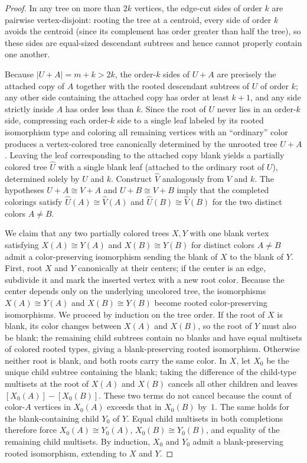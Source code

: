 \documentclass[10pt]{article}
\begin{document}
\begin{proof}
In any tree on more than $2k$ vertices, the edge-cut sides of order $k$ are pairwise vertex-disjoint: rooting the tree at a centroid, every side of order $k$ avoids the centroid (since its complement has order greater than half the tree), so these sides are equal-sized descendant subtrees and hence cannot properly contain one another.

Because $|U+A| = m+k > 2k$, the order-$k$ sides of $U+A$ are precisely the attached copy of $A$ together with the rooted descendant subtrees of $U$ of order $k$; any other side containing the attached copy has order at least $k+1$, and any side strictly inside $A$ has order less than $k$. Since the root of $U$ never lies in an order-$k$ side, compressing each order-$k$ side to a single leaf labeled by its rooted isomorphism type and coloring all remaining vertices with an ``ordinary'' color produces a vertex-colored tree canonically determined by the unrooted tree $U+A$. Leaving the leaf corresponding to the attached copy blank yields a partially colored tree $\widehat{U}$ with a single blank leaf (attached to the ordinary root of $U$), determined solely by $U$ and $k$. Construct $\widehat{V}$ analogously from $V$ and $k$. The hypotheses $U+A\cong V+A$ and $U+B\cong V+B$ imply that the completed colorings satisfy $\widehat{U}(A)\cong \widehat{V}(A)$ and $\widehat{U}(B)\cong \widehat{V}(B)$ for the two distinct colors $A\neq B$.

We claim that any two partially colored trees $X,Y$ with one blank vertex satisfying $X(A)\cong Y(A)$ and $X(B)\cong Y(B)$ for distinct colors $A\neq B$ admit a color-preserving isomorphism sending the blank of $X$ to the blank of $Y$. First, root $X$ and $Y$ canonically at their centers; if the center is an edge, subdivide it and mark the inserted vertex with a new root color. Because the center depends only on the underlying uncolored tree, the isomorphisms $X(A)\cong Y(A)$ and $X(B)\cong Y(B)$ become rooted color-preserving isomorphisms. We proceed by induction on the tree order. If the root of $X$ is blank, its color changes between $X(A)$ and $X(B)$, so the root of $Y$ must also be blank; the remaining child subtrees contain no blanks and have equal multisets of colored rooted types, giving a blank-preserving rooted isomorphism. Otherwise neither root is blank, and both roots carry the same color. In $X$, let $X_0$ be the unique child subtree containing the blank; taking the difference of the child-type multisets at the root of $X(A)$ and $X(B)$ cancels all other children and leaves $[X_0(A)]-[X_0(B)]$. These two terms do not cancel because the count of color-$A$ vertices in $X_0(A)$ exceeds that in $X_0(B)$ by~$1$. The same holds for the blank-containing child $Y_0$ of $Y$. Equal child multisets in both completions therefore force $X_0(A)\cong Y_0(A)$, $X_0(B)\cong Y_0(B)$, and equality of the remaining child multisets. By induction, $X_0$ and $Y_0$ admit a blank-preserving rooted isomorphism, extending to $X$ and $Y$.


\end{proof}
\end{document}
